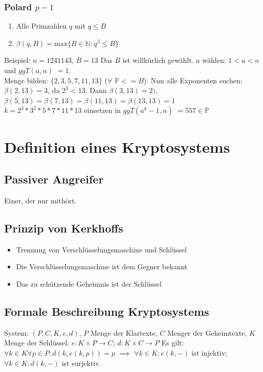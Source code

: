 \documentclass[landscape,twocolumn,a4paper]{article}
\newcommand{\PN}{\mathbb{P}} %
\begin{document}
\subsubsection{Polard $p -1$}
\begin{enumerate}
\item Alle Primzahlen $q$ mit $q \le B$
\item $\beta(q, B) = \text{max}\{B \in \mathbb{N}: q^\beta \le B\}$
\end{enumerate}
Beispiel:
$n=1241143$, $B=13$ Das $B$ ist willkürlich gewählt. $a$ wählen: $ 1 < a < n$ und $ggT(a, n)$ $= 1$. \\
Menge bilden: $\{2, 3, 5, 7, 11, 13\}$ ($\forall$ $\PN<=B$). Nun alle Exponenten suchen: $\beta (2, 13) = 3$, da $2^3 < 13$. Dann $\beta (3, 13) = 2)$, 
$\beta (5, 13) = \beta (7, 13) = \beta (11, 13) = \beta (13, 13) = 1$ \\
$k = 2^3 * 3^2 * 5 * 7 * 11 * 13$ einsetzen in $ggT(a^k-1, n)$ $= 557 \in \PN$

\section{Definition eines Kryptosystems}
\subsection{Passiver Angreifer}
Einer, der nur mithört.
\subsection{Prinzip von Kerkhoffs}
\begin{itemize}
	\item Trennung von Verschlüsselungsmaschine und Schlüssel
	\item Die Verschlüsselungsmaschine ist dem Gegner bekannt
	\item Das zu schützende Geheimnis ist der Schlüssel
\end{itemize}
\subsection{Formale Beschreibung Kryptosystems}
System: $(P, C, K, e, d)$, $P$ Menge der Klartexte, $C$ Menger der Geheimtexte, $K$ Menge der Schlüssel:
$e: K \times P \rightarrow C$; $d: K \times C \rightarrow P$
Es gilt: $\forall k \in K \forall p \in P: d (k, e (k, p)) = p$ $\implies$ $\forall k \in K : e(k, -)$ ist injektiv; $\forall k \in K: d(k, -)$ ist surjektiv.
\end{document}
